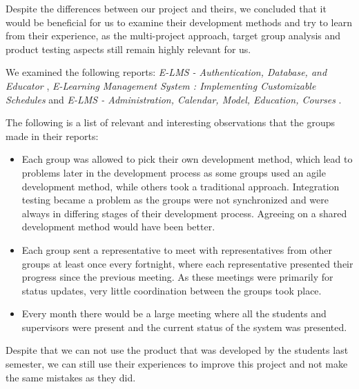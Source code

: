 Despite the differences between our project and theirs, we concluded that it would be beneficial for us to examine their development methods and try to learn from their experience, as the multi-project approach, target group analysis and product testing aspects still remain highly relevant for us. 

We examined the following reports: \emph{E-LMS - Authentication, Database, and Educator} \cite{E-LMS-ADE},  \emph{E-Learning Management System : Implementing Customizable Schedules} \cite{E-LMS-ICS} and \emph{E-LMS - Administration, Calendar, Model, Education, Courses} \cite{E-LMS-ACMEC}.

The following is a list of relevant and interesting observations that the groups made in their reports:
\begin{itemize}
	\item{Each group was allowed to pick their own development method, which lead to problems later in the development process as some groups used an agile development method, while others took a traditional approach. 
	Integration testing became a problem as the groups were not synchronized and were always in differing stages of their development process. 
	Agreeing on a shared development method would have been better.}
	\item{Each group sent a representative to meet with representatives from other groups at least once every fortnight, where each representative presented their progress since the previous meeting. 
	As these meetings were primarily for status updates, very little coordination between the groups took place.}
	\item{Every month there would be a large meeting where all the students and supervisors were present and the current status of the system was presented.}
\end{itemize}

Despite that we can not use the product that was developed by the students last semester, we can still use their experiences to improve this project and not make the same mistakes as they did. 
